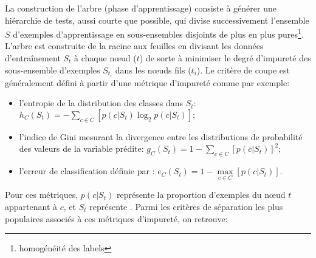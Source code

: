 La construction de l'arbre (phase d'apprentissage) consiste à générer une hiérarchie de tests, aussi courte que possible, qui divise successivement l'ensemble $S$ d'exemples d'apprentissage en sous-ensembles disjoints de plus en plus pures\footnote{homogénéité des labels}. %
L'arbre est construite de la racine aux feuilles en divisant les données d'entraînement $S_{t}$ à chaque nœud ($t$) de sorte à minimiser le degré d'impureté des sous-ensemble d'exemples  $S_{t_i}$ dans les nœuds fils ($t_i$). Le critère de coupe est généralement défini à partir d'une métrique d'impureté comme par exemple:
\begin{itemize}
	\item l'entropie de la distribution des classes dans $S_t$: \\ $h_C(S_t) = - \sum\limits_{c \in C} \left[p(c \vert S_t) \log_2 p(c \vert S_t)\right];$
	\item l'indice de Gini mesurant la divergence entre les distributions de probabilité des valeurs de la variable prédite: $g_C(S_t) = 1 - \sum\limits_{c \in C} \left[p(c \vert S_t)\right]^2;$
	\item l'erreur de classification définie par : $e_C(S_t) = 1 - \max\limits_{c \in C} \left[p(c \vert S_t)\right]$. 
\end{itemize}
Pour ces métriques, $p(c \vert S_t)$ représente la proportion d'exemples du nœud $t$ appartenant à $c$, et $S_t$ représente . Parmi les critères de séparation les plus populaires associés à ces métriques d'impureté, on retrouve: 


